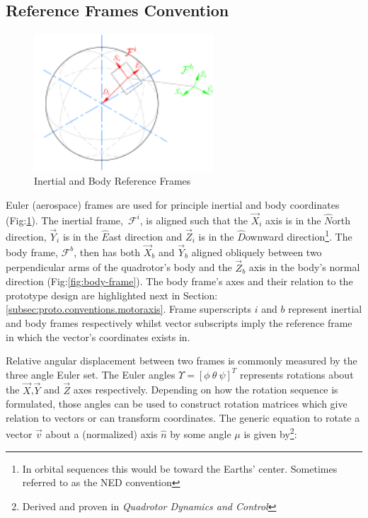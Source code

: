 \subsection{Reference Frames Convention}
\label{subsec:proto.conventions.frames}
\begin{figure}[htbp]
\centering
\includegraphics[width=0.6\textwidth]{figs/reference_frame}
\caption{Inertial and Body Reference Frames}
\label{fig:ref_frame}
\end{figure}
Euler (aerospace) frames are used for principle inertial and body coordinates (Fig:\ref{fig:ref_frame}). The inertial frame,~$\mathcal{F}^i$, is aligned such that the $\vec{X}_i$ axis is in the $\hat{N}$orth direction, $\vec{Y}_i$ is in the $\hat{E}$ast direction and $\vec{Z}_i$ is  in the $\hat{D}$ownward direction\footnote{In orbital sequences this would be toward the Earths' center. Sometimes referred to as the NED convention}. The body frame, $\mathcal{F}^b$, then has both $\vec{X}_b$ and $\vec{Y}_b$ aligned obliquely between two perpendicular arms of the quadrotor's body and the $\vec{Z}_b$ axis in the body's normal direction (Fig:\ref{fig:body-frame}). The body frame's axes and their relation to the prototype design are highlighted next in Section:\ref{subsec:proto.conventions.motoraxis}. Frame superscripts $i$ and $b$ represent inertial and body frames respectively whilst vector subscripts imply the reference frame in which the vector's coordinates exists in.
\par
Relative angular displacement between two frames is commonly measured by the three angle Euler set. The Euler angles $\Upsilon=[\phi ~\theta ~\psi]^T$ represents rotations about the $\vec{X}$,$\vec{Y}$ and $\vec{Z}$ axes respectively. Depending on how the rotation sequence is formulated, those angles can be used to construct rotation matrices which give relation to vectors or can transform coordinates. The generic equation to rotate a vector $\vec{v}$ about a (normalized) axis $\hat{n}$ by some angle $\mu$ is given by\footnote{Derived and proven in \emph{Quadrotor Dynamics and Control}\cite{quaddynamics}}:
